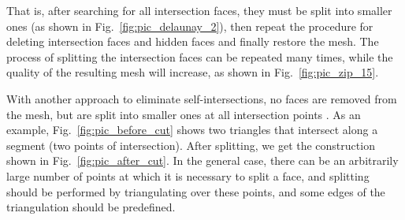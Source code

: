 \documentclass[
11pt,%
tightenlines,%
twoside,%
onecolumn,%
nofloats,%
nobibnotes,%
nofootinbib,%
superscriptaddress,%
noshowpacs,%
centertags]%
{revtex4-2}
\begin{document}
That is, after searching for all intersection faces, they must be split into smaller ones (as shown in Fig.~\ref{fig:pic_delaunay_2}), then repeat the procedure for deleting intersection faces and hidden faces and finally restore the mesh.
The process of splitting the intersection faces can be repeated many times, while the quality of the resulting mesh will increase, as shown in Fig.~\ref{fig:pic_zip_15}.

With another approach to eliminate self-intersections, no faces are removed from the mesh, but are split into smaller ones at all intersection points \cite{Skvorkovska}.
As an example, Fig.~\ref{fig:pic_before_cut} shows two triangles that intersect along a segment (two points of intersection).
After splitting, we get the construction shown in Fig.~\ref{fig:pic_after_cut}.
In the general case, there can be an arbitrarily large number of points at which it is necessary to split a face, and splitting should be performed by triangulating over these points, and some edges of the triangulation should be predefined.
\end{document}
